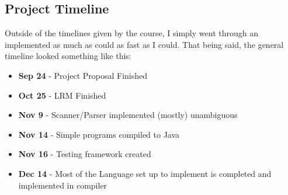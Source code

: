 \documentclass{article}
\begin{document}
\subsection{Project Timeline}
Outside of the timelines given by the course, I simply went through an implemented as much as could as fast as I could. That being said, the general timeline looked something like this:
\begin{itemize}
\item \textbf{Sep 24} - Project Proposal Finished
\item \textbf{Oct 25} - LRM Finished
\item \textbf{Nov 9} - Scanner/Parser implemented (mostly) unambiguous
\item \textbf{Nov 14} - Simple programs compiled to Java
\item \textbf{Nov 16} - Testing framework created
\item \textbf{Dec 14} - Most of the Language set up to implement is completed and implemented in compiler
\end{itemize}
\end{document}
